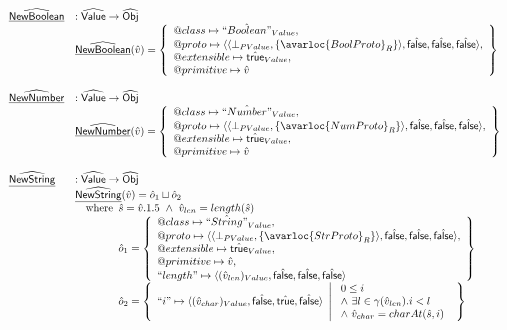 \[
\begin{array}{ll}

\ahf{NewBoolean} & : \abs{Value} \rightarrow \aObj \\
& \ahf{NewBoolean}(\hat{v}) = \set{
    \varprop{class}\mapsto \hat{``Boolean"}_{Value},\\
    \varprop{proto}\mapsto 
    \langle\langle\bot_{PValue},\{\avarloc{BoolProto}_R\}\rangle,\afalse,\afalse,\afalse\rangle,\\
    \varprop{extensible}\mapsto \atrue_{Value}, \\
    \varprop{primitive}\mapsto \hat{v}
}\\\\

\ahf{NewNumber} & : \abs{Value} \rightarrow \aObj \\
& \ahf{NewNumber}(\hat{v}) = \set{
    \varprop{class}\mapsto \hat{``Number"}_{Value},\\
    \varprop{proto}\mapsto 
    \langle\langle\bot_{PValue},\{\avarloc{NumProto}_R\}\rangle,\afalse,\afalse,\afalse\rangle,\\
    \varprop{extensible}\mapsto \atrue_{Value}, \\
    \varprop{primitive}\mapsto \hat{v}
}\\\\

\ahf{NewString} & : \abs{Value} \rightarrow \aObj \\
& \ahf{NewString}(\hat{v}) = \hat{o}_1 \sqcup \hat{o}_2 \\
& \quad\wherec{
  \hat{s} = \hat{v}.1.5\ \land\ \hat{v}_{len} = length(\hat{s})\\
  \hat{o}_1 = \set{
    \varprop{class}\mapsto \hat{``String"}_{Value},\\
    \varprop{proto}\mapsto 
    \langle\langle\bot_{PValue},\{\avarloc{StrProto}_R\}\rangle,\afalse,\afalse,\afalse\rangle,\\
    \varprop{extensible}\mapsto \atrue_{Value}, \\
    \varprop{primitive}\mapsto \hat{v}, \\
    ``length"\mapsto \langle (\hat{v}_{len})_{Value}, \afalse, \afalse, \afalse\rangle \\
  } \\
  \hat{o}_2 = \set{``i"\mapsto \langle (\hat{v}_{char})_{Value}, \afalse, \atrue, \afalse\rangle ~\left|~
      \begin{array}{l}
        0 \leq i\\
        \land\ \exists l\in\gamma(\hat{v}_{len}).i < l\\
        \land\ \hat{v}_{char} = charAt(\hat{s},i)
      \end{array}
    \right.}
}\\


\end{array}\]
